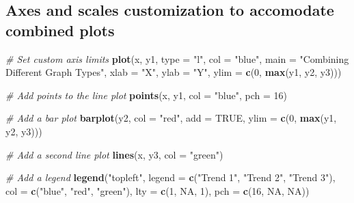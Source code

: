\documentclass[
]{book}
\newenvironment{Shaded}{\begin{snugshade}}{\end{snugshade}}
\newcommand{\AttributeTok}[1]{\textcolor[rgb]{0.13,0.29,0.53}{#1}}
\newcommand{\CommentTok}[1]{\textcolor[rgb]{0.56,0.35,0.01}{\textit{#1}}}
\newcommand{\ConstantTok}[1]{\textcolor[rgb]{0.56,0.35,0.01}{#1}}
\newcommand{\DecValTok}[1]{\textcolor[rgb]{0.00,0.00,0.81}{#1}}
\newcommand{\FunctionTok}[1]{\textcolor[rgb]{0.13,0.29,0.53}{\textbf{#1}}}
\newcommand{\NormalTok}[1]{#1}
\newcommand{\StringTok}[1]{\textcolor[rgb]{0.31,0.60,0.02}{#1}}
\begin{document}
\subsection{Axes and scales customization to accomodate combined plots}\label{axes-and-scales-customization-to-accomodate-combined-plots}

\begin{Shaded}
\begin{Highlighting}[]
\CommentTok{\# Set custom axis limits}
\FunctionTok{plot}\NormalTok{(x, y1, }\AttributeTok{type =} \StringTok{"l"}\NormalTok{, }\AttributeTok{col =} \StringTok{"blue"}\NormalTok{, }\AttributeTok{main =} \StringTok{"Combining Different Graph Types"}\NormalTok{, }\AttributeTok{xlab =} \StringTok{"X"}\NormalTok{, }\AttributeTok{ylab =} \StringTok{"Y"}\NormalTok{, }\AttributeTok{ylim =} \FunctionTok{c}\NormalTok{(}\DecValTok{0}\NormalTok{, }\FunctionTok{max}\NormalTok{(y1, y2, y3)))}

\CommentTok{\# Add points to the line plot}
\FunctionTok{points}\NormalTok{(x, y1, }\AttributeTok{col =} \StringTok{"blue"}\NormalTok{, }\AttributeTok{pch =} \DecValTok{16}\NormalTok{)}

\CommentTok{\# Add a bar plot}
\FunctionTok{barplot}\NormalTok{(y2, }\AttributeTok{col =} \StringTok{"red"}\NormalTok{, }\AttributeTok{add =} \ConstantTok{TRUE}\NormalTok{, }\AttributeTok{ylim =} \FunctionTok{c}\NormalTok{(}\DecValTok{0}\NormalTok{, }\FunctionTok{max}\NormalTok{(y1, y2, y3)))}

\CommentTok{\# Add a second line plot}
\FunctionTok{lines}\NormalTok{(x, y3, }\AttributeTok{col =} \StringTok{"green"}\NormalTok{)}

\CommentTok{\# Add a legend}
\FunctionTok{legend}\NormalTok{(}\StringTok{"topleft"}\NormalTok{, }\AttributeTok{legend =} \FunctionTok{c}\NormalTok{(}\StringTok{"Trend 1"}\NormalTok{, }\StringTok{"Trend 2"}\NormalTok{, }\StringTok{"Trend 3"}\NormalTok{), }\AttributeTok{col =} \FunctionTok{c}\NormalTok{(}\StringTok{"blue"}\NormalTok{, }\StringTok{"red"}\NormalTok{, }\StringTok{"green"}\NormalTok{), }\AttributeTok{lty =} \FunctionTok{c}\NormalTok{(}\DecValTok{1}\NormalTok{, }\ConstantTok{NA}\NormalTok{, }\DecValTok{1}\NormalTok{), }\AttributeTok{pch =} \FunctionTok{c}\NormalTok{(}\DecValTok{16}\NormalTok{, }\ConstantTok{NA}\NormalTok{, }\ConstantTok{NA}\NormalTok{))}
\end{Highlighting}
\end{Shaded}
\end{document}
